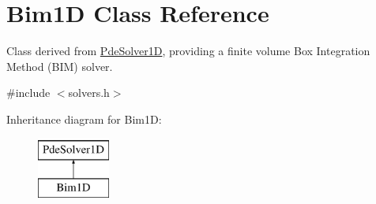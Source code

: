 \hypertarget{classBim1D}{\section{Bim1\-D Class Reference}
\label{classBim1D}
}


Class derived from \hyperlink{classPdeSolver1D}{Pde\-Solver1\-D}, providing a finite volume Box Integration Method (B\-I\-M) solver.  




{\ttfamily \#include $<$solvers.\-h$>$}

Inheritance diagram for Bim1\-D\-:\begin{figure}[H]
\begin{center}
\leavevmode
\includegraphics[height=2.000000cm]{classBim1D}
\end{center}
\end{figure}
